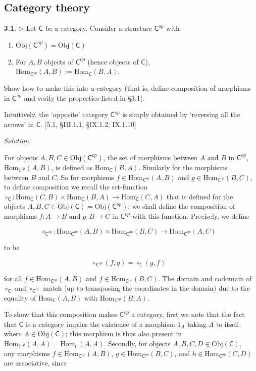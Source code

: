 \documentclass[14pt,parskip=full]{scrartcl}
\newcommand{\exercise}[3]{
\noindent
\textbf{#1.} #2

\noindent
\textit{Solution.}{\let\tpar\par \let\par\relax #3}
}
\newcommand{\Obj}{\mathrm{Obj}}
\newcommand{\Hom}{\mathrm{Hom}}
\begin{document}
\subsection{Category theory}

\exercise
{3.1}{$\rhd$ Let $\mathsf{C}$ be a category. Consider a structure
$\mathsf{C}^{op}$ with
\begin{enumerate}
\item $\Obj(\mathsf{C}^{op}) = \Obj(\mathsf{C})$
\item For $A, B$ objects of $\mathsf{C}^{op}$ (hence objects of $\mathsf{C}$),
$\Hom_{\mathsf{C}^{op}}(A, B) := \Hom_{\mathsf{C}}(B, A)$.
\end{enumerate}
Show how to make this into a category (that is, define composition of morphisms
in $\mathsf{C}^{op}$ and verify the properties listed in \S3.1).

Intuitively, the `opposite' category $\mathsf{C}^{op}$ is simply obtained by
`reversing all the arrows' in $\mathsf{C}$. [5.1, \S III.1.1, \S IX.1.2,
IX.1.10]}{

For objects $A,B,C\in\Obj(\mathsf{C}^{op})$, the set of morphisms between $A$
and $B$ in $\mathsf{C}^{op}$, $\Hom_{\mathsf{C}^{op}}(A,B)$, is defined as
$\Hom_{\mathsf{C}}(B, A)$. Similarly for the morphisms between $B$ and $C$. So
for morphisms $f\in\Hom_{\mathsf{C}^{op}}(A,B)$ and
$g\in\Hom_{\mathsf{C}^{op}}(B,C)$, to define composition we recall the
set-function $\circ_{\mathsf{C}} : \Hom_{\mathsf{C}}(C,B) \times
\Hom_{\mathsf{C}}(B,A) \to\Hom_{\mathsf{C}}(C,A)$ that is defined for the
objects $A,B,C\in\Obj(\mathsf{C})=\Obj(\mathsf{C}^{op})$; we shall define the
composition of morphisms $f:A\to B$ and $g:B\to C$ in $\mathsf{C}^{op}$ with
this function. Precisely, we define

\[ \circ_{\mathsf{C}^{op}}: \Hom_{\mathsf{C}^{op}}(A,B) \times
\Hom_{\mathsf{C}^{op}}(B,C) \to \Hom_{\mathsf{C}^{op}}(A,C) \]

to be

\[ \circ_{\mathsf{C}^{op}}(f,g) = \circ_{\mathsf{C}}(g,f) \]

for all $f\in\Hom_{\mathsf{C}^{op}}(A,B)$ and $f\in\Hom_{\mathsf{C}^{op}}(B,C)$.
The domain and codomain of $\circ_{\mathsf{C}}$ and $\circ_{\mathsf{C}^{op}}$
match (up to transposing the coordinates in the domain) due to the equality of
$\Hom_{\mathsf{C}}(A,B)$ with $\Hom_{\mathsf{C}^{op}}(B,A)$.

\tpar
To show that this composition makes $\mathsf{C}^{op}$ a category, first we note
that the fact that $\mathsf{C}$ is a category implies the existence of a
morphism $1_{A}$ taking $A$ to itself where $A\in\Obj(\mathsf{C})$; this
morphism is thus also present in $\Hom_{\mathsf{C}^{op}}(A,A) =
\Hom_{\mathsf{C}}(A,A)$. Secondly, for objects $A,B,C,D\in\Obj(\mathsf{C})$, any
morphisms $f\in\Hom_{\mathsf{C}^{op}}(A,B)$, $g\in\Hom_{\mathsf{C}^{op}}(B,C)$,
and $h\in\Hom_{\mathsf{C}^{op}}(C,D)$ are associative, since

}
\end{document}
